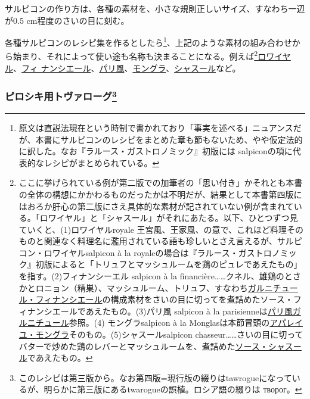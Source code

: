 \begin{recette}
サルピコンの作り方は、各種の素材を、小さな規則正しいサイズ、すなわち一辺が0.5
cm程度のさいの目に刻む。

各種サルピコンのレシピ集を作るとしたら\footnote{原文は直説法現在という時制で書かれており「事実を述べる」ニュアンスだが、本書にサルピコンのレシピをまとめた章も節もないため、やや仮定法的に訳した。なお『ラルース・ガストロノミック』初版には
  salpiconの項に代表的なレシピがまとめられている。}、上記のような素材の組み合わせから始まり、それによって使い途も名称も決まることになる。例えば\footnote{ここに挙げられている例が第二版での加筆者の「思い付き」かそれとも本書の全体の構想にかかわるものだったかは不明だが、結果として本書第四版にはおろか肝心の第二版にさえ具体的な素材が記されていない例が含まれている。「ロワイヤル」と「シャスール」がそれにあたる。以下、ひとつずつ見ていくと、(1)ロワイヤルroyale
  王宮風、王家風、の意で、これほど料理そのものと関連なく料理名に濫用されている語も珍しいとさえ言えるが、サルピコン・ロワイヤルsalpicon
  à la
  royaleの場合は『ラルース・ガストロノミック』初版によると「トリュフとマッシュルームを鶏のピュレであえたもの」を指す。(2)フィナンシーエル
  salpicon à la
  financière\ldots{}\ldots{}クネル、雄鶏のとさかとロニョン（精巣）、マッシュルーム、トリュフ、すなわち\protect\hyperlink{garniture-a-la-financiere}{ガルニチュール・フィナンシエール}の構成素材をさいの目に切ってを煮詰めたソース・フィナンシエールであえたもの。(3)パリ風
  salpicon à la
  parisienneは\protect\hyperlink{garniture-parisienne}{パリ風ガルニチュール}参照。(4)
  モングラsalpicon à la
  Monglasは本節冒頭の\protect\hyperlink{appareil-montglas}{アパレイユ・モングラ}そのもの。(5)シャスールsalpicon
  chasseur\ldots{}\ldots{}さいの目に切ってバターで炒めた鶏のレバーとマッシュルームを、煮詰めた\protect\hyperlink{sauce-chasseur}{ソース・シャスール}であえたもの。}\ul{ロワイヤル}、\ul{フィ
ナンシエール}、\ul{パリ風}、\ul{モングラ}、\ul{シャスール}など。

\hypertarget{ux30d4ux30edux30b7ux30adux7528ux30c8ux30f4ux30a1ux30edux30fcux30b072}{%
\subsubsection[ピロシキ用トヴァローグ]{\texorpdfstring{ピロシキ用トヴァローグ\footnote{このレシピは第三版から。なお第四版=現行版の綴りはtawrogueになっているが、明らかに第三版にあるtwarogueの誤植。ロシア語の綴りは
  творог。}}{ピロシキ用トヴァローグ}}\label{ux30d4ux30edux30b7ux30adux7528ux30c8ux30f4ux30a1ux30edux30fcux30b072}}


\end{recette}
